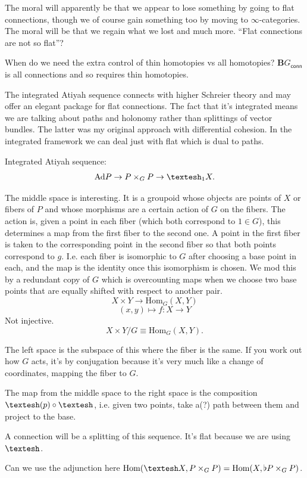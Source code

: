 \documentclass[12pt]{article}
\newcommand{\Hom}{\mathrm{Hom}}
\newcommand{\shape}{\ensuremath{\text{\textesh}}}
\newcommand{\bgconn}{\ensuremath{\textbf{B}G_{\textsf{conn}}}}
\begin{document}
The moral will apparently be that we appear to lose something by going to flat connections, though we of course gain something too by moving to $\infty$-categories. The moral will be that we regain what we lost and much more. ``Flat connections are not so flat''?

When do we need the extra control of thin homotopies vs all homotopies? $\bgconn$ is all connections and so requires thin homotopies.

The integrated Atiyah sequence connects with higher Schreier theory and may offer an elegant package for flat connections. The fact that it's integrated means we are talking about paths and holonomy rather than splittings of vector bundles. The latter was my original approach with differential cohesion. In the integrated framework we can deal just with flat which is dual to paths.

Integrated Atiyah sequence: \[ \mathrm{Ad}P \to P\times_GP \to \shape_1X.\]

The middle space is interesting. It is a groupoid whose objects are points of $X$ or fibers of $P$ and whose morphisms are a certain action of $G$ on the fibers. The action is, given a point in each fiber (which both correspond to $1\in G$), this determines a map from the first fiber to the second one. A point in the first fiber is taken to the corresponding point in the second fiber so that both points correspond to $g$. I.e. each fiber is isomorphic to $G$ after choosing a base point in each, and the map is the identity once this isomorphism is chosen. We mod this by a redundant copy of $G$ which is overcounting maps when we choose two base points that are equally shifted with respect to another pair. \[X\times Y \to \Hom_G(X, Y)\] \[(x, y) \mapsto f: X \to Y\] Not injective. \[ X\times Y / G \equiv \Hom_G(X, Y).\]

The left space is the subspace of this where the fiber is the same. If you work out how $G$ acts, it's by conjugation because it's very much like a change of coordinates, mapping the fiber to $G$.

The map from the middle space to the right space is the composition $\shape(p)\circ\shape$, i.e. given two points, take a(?) path between them and project to the base.

 A connection will be a splitting of this sequence. It's flat because we are using $\shape$.

Can we use the adjunction here $\Hom(\shape X, P\times_GP) = \Hom(X, \flat P\times_GP)$.
\end{document}

